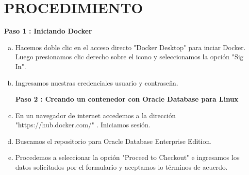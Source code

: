 \documentclass[preprint,12pt]{elsarticle}
\begin{document}
\section{PROCEDIMIENTO}
\textbf{Paso 1 : Iniciando Docker}
\begin{enumerate}[a)]
\item Hacemos doble clic en el acceso directo "Docker Desktop" para inciar Docker. Luego presionamos clic derecho sobre el icono y seleccionamos la opción "Sig In".
\begin{figure}[htb]
	
\end{figure}
\item Ingresamos nuestras credenciales usuario  y contraseña.

\textbf{Paso 2 : Creando un contenedor con Oracle Database para Linux}
\item En un navegador de internet accedemos a la dirección "https://hub.docker.com/" .\newline 
Iniciamos sesión.
\begin{figure}[htb]
	
\end{figure}

\item Buscamos el repositorio para Oracle Database Enterprise Edition.
\begin{figure}[htb]

\end{figure}

\item Procedemos a seleccionar la opción "Proceed to Checkout" e ingresamos los datos solicitados por el formulario y aceptamos lo términos de acuerdo.
\begin{figure}[htb]
	
\end{figure}


\end{enumerate}
\end{document}
